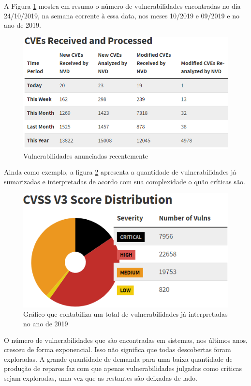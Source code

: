 A Figura \ref{fig:intro1} mostra em resumo o número de vulnerabilidades encontradas no dia 24/10/2019, na semana corrente à essa data, nos meses 10/2019 e 09/2019 e no ano de 2019. 

\begin{figure}[H]
\centering
\includegraphics[width=1\textwidth]{imagens/grafico_cve.png}
\caption{Vulnerabilidades anunciadas recentemente}
\label{fig:intro1}
\end{figure}

Ainda como exemplo, a figura \ref{fig:intro2} apresenta a quantidade de vulnerabilidades já sumarizadas e interpretadas de acordo com sua complexidade o quão críticas são.

\begin{figure}[H]
\centering
\includegraphics[width=1\textwidth]{imagens/grafico_cve_score.png}
\caption{Gráfico que contabiliza um total de vulnerabilidades já interpretadas no ano de 2019}
\label{fig:intro2}
\end{figure}

O número de vulnerabilidades que são encontradas em sistemas, nos últimos anos, cresceu de forma exponencial. Isso não significa que todas descobertas foram exploradas. A grande quantidade de demanda para uma baixa quantidade de produção de reparos faz com que apenas vulnerabilidades julgadas como críticas sejam exploradas, uma vez que as restantes são deixadas de lado.

